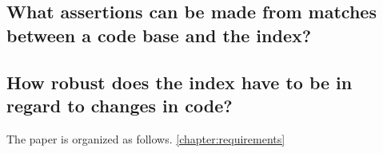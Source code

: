 \subsection*{What assertions can be made from matches between a code base and the index?}
\subsection*{How robust does the index have to be in regard to changes in code?}



The paper is organized as follows.
\autoref{chapter:requirements}